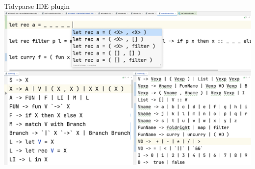 \documentclass{beamer}
\begin{document}
    \begin{frame}[fragile]{Tidyparse IDE plugin}
        \href{https://github.com/breandan/tidyparse}{\includegraphics[width=\textwidth]{../figures/tidyparse.png}}
    \end{frame}
\end{document}
